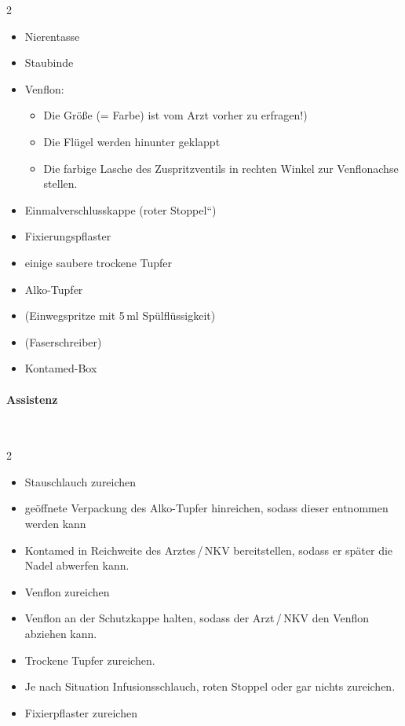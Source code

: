 \begin{multicols}{2}
\begin{itemize}
    \item Nierentasse
    \item Staubinde
    \item Venflon:
    \begin{itemize}
        \item Die Größe (= Farbe) ist vom Arzt vorher zu erfragen!)
        \item Die Flügel werden hinunter geklappt
        \item Die farbige Lasche des Zuspritzventils in rechten Winkel zur
        Venflonachse stellen.
    \end{itemize}
    \item Einmalverschlusskappe ({\quotedblbase}roter
    Stoppel{\textquotedblleft})
    \item Fixierungspflaster
    \item einige saubere trockene Tupfer
    \item Alko-Tupfer
    \item (Einwegspritze mit 5\,ml Spülflüssigkeit)
    \item (Faserschreiber)
    \item Kontamed-Box
\end{itemize}
\end{multicols}

\paragraph*{Assistenz}~

\begin{multicols}{2}

\begin{itemize}
    \item Stauschlauch zureichen
    \item geöffnete Verpackung des Alko-Tupfer hinreichen, sodass dieser
    entnommen werden kann
    \item Kontamed in Reichweite des  Arztes\,/\,NKV
    bereitstellen, sodass er später die Nadel abwerfen kann.
    \item Venflon zureichen
\end{itemize}
\begin{itemize}
    \item Venflon an der Schutzkappe halten, sodass der
    Arzt\,/\,NKV den Venflon abziehen kann.
    
\end{itemize}
\begin{itemize}
    \item Trockene Tupfer zureichen.
    \item Je nach Situation Infusionsschlauch, roten Stoppel oder gar nichts
    zureichen.
    \item Fixierpflaster zureichen
\end{itemize}

\end{multicols}

